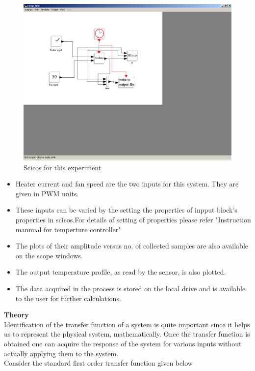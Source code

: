 \documentclass[12pt]{article}
\begin{document}
 \begin{figure}[ht]
\centering
\includegraphics[width=\linewidth]{rampscicos}
\caption{Scicos for this experiment}
\label{scicos}
\end{figure}
\pagebreak 
\begin{itemize}
\item Heater current and fan speed are the two inputs for this system. They are given in PWM units. 
\item These inputs can be varied by the setting the properties of inpput block's properties in scicos.For details of setting of properties please refer "Instruction mannual for temperture controller"
\item The plots of their amplitude versus no. of collected samples are also available on the scope windows. 
\item The output temperature profile, as read by the sensor, is also plotted.   
\item The data acquired in the process is stored on the local drive and is available to the user for further calculations.
\end{itemize}
\newpage
\textbf{Theory}\\
Identification of the transfer function of a system is quite important since it helps us to represent the physical system, mathematically. Once the transfer function is obtained one can acquire the response of the system for various inputs without actually applying them to the system.\\Consider the standard first order transfer function given below
\end{document}
